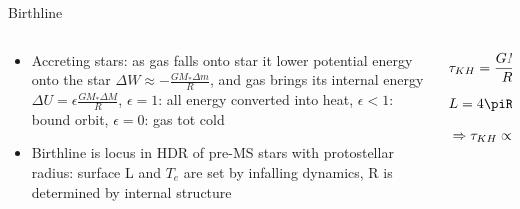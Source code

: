 \begin{frame}{Birthline}
    \begin{columns}[T]
        \begin{column}{0.6\textwidth}
    \begin{itemize}
        \item Accreting stars: as gas falls onto star it lower potential energy onto the star $\Delta W\approx -\frac{GM_*\Delta m}{R}$, and gas brings its internal energy $\Delta U=\epsilon\frac{GM_*\Delta M}{R}$, $\epsilon=1$: all energy converted into heat, $\epsilon<1$: bound orbit, $\epsilon=0$: gas tot cold
        \item Birthline is locus in HDR of pre-MS stars with protostellar radius: surface L and $T_e$ are set by infalling dynamics, R is determined by internal structure
        \end{itemize}
        \end{column}
        \begin{column}{0.4\textwidth}
            \begin{align*}
                &\tkh{}=\frac{GM_*^2}{RL}: \dot{R}_*=-n_1 \frac{R_*}{\tkh{}}\\
                &L=4\piR_*^2\sigma T_e^4: \dot{L}_*=-n_2 \frac{L_*}{\tkh{}}\\
                &\Rightarrow\tkh{}\propto L_*^{-3/2}\tag{fixed mass}
            \end{align*}
        \end{column}
    \end{columns}
\end{frame}


